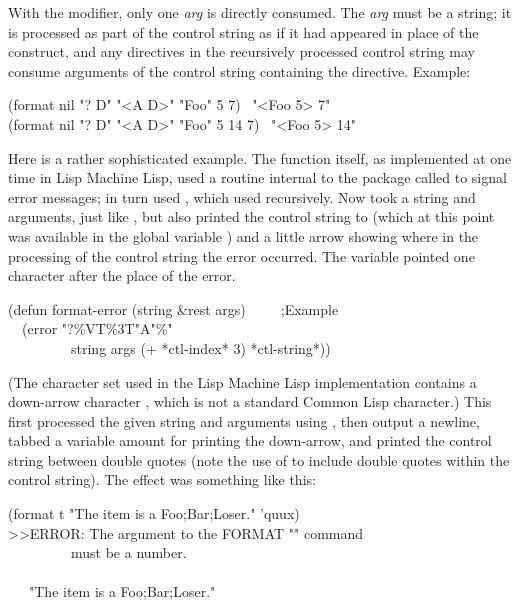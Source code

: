 \begin{flushdesc}
With the \cd{{\Xatsign}} modifier, only one \emph{arg} is directly consumed.
The \emph{arg} must be a string; it is processed as part of the control
string as if it had appeared in place of the  construct,
and any directives in the recursively processed control string may
consume arguments of the control string containing the 
directive.
Example:
\begin{lisp}
(format nil "{\Xtilde}{\Xatsign}? {\Xtilde}D" "<{\Xtilde}A {\Xtilde}D>" "Foo" 5 7) \EV\ "<Foo 5> 7" \\
(format nil "{\Xtilde}{\Xatsign}? {\Xtilde}D" "<{\Xtilde}A {\Xtilde}D>" "Foo" 5 14 7) \EV\ "<Foo 5> 14"
\end{lisp}

Here is a rather sophisticated example.
The  function itself,
as implemented at one time in Lisp Machine Lisp,
used a routine internal to the  package called  to
signal error messages;  in turn used , which used
 recursively.  Now  took a string and
arguments, just like , but also printed the control string
to  (which at this point was available
in the global variable ) and a little
arrow showing where in the processing of the control string the error
occurred.  The variable  pointed one character after the
place of the error.
\begin{lisp}
(defun format-error (string \&rest args)~~~~~;\textrm{Example} \\
~~(error {\false} "{\Xtilde}?{\Xtilde}\%{\Xtilde}V{\Xatsign}T{\Xarrowdown}{\Xtilde}\%{\Xtilde}3{\Xatsign}T{\Xbackslash}"{\Xtilde}A{\Xbackslash}"{\Xtilde}\%" \\
~~~~~~~~~string args (+ *ctl-index* 3) *ctl-string*))
\end{lisp}
(The character set used in the Lisp Machine Lisp implementation contains a
down-arrow character \cd{\Xarrowdown}, which is not a standard Common Lisp
character.)  This first processed the given string and arguments using
, then output a newline, tabbed a variable amount for
printing the down-arrow, and printed the control string between
double quotes (note the use of  to include double quotes within
the control string).  The effect was something like this:
\begin{lisp}
(format t "The item is a {\Xtilde}{\Xlbracket}Foo{\Xtilde};Bar{\Xtilde};Loser{\Xtilde}{\Xrbracket}." 'quux) \\
>>ERROR: The argument to the FORMAT "{\Xtilde}{\Xlbracket}" command  \\
~~~~~~~~~must be a number. \\
~~~~~~~~~~~~~~~~~~~{\Xarrowdown} \\
~~~"The item is a {\Xtilde}{\Xlbracket}Foo{\Xtilde};Bar{\Xtilde};Loser{\Xtilde}{\Xrbracket}."
\end{lisp}


\end{flushdesc}
